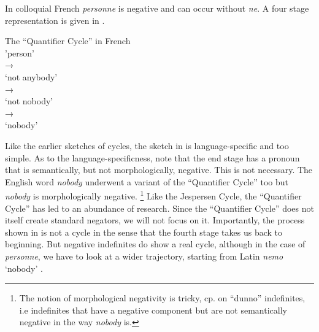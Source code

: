 ﻿\documentclass[output=paper]{langsci/langscibook}
\begin{document}
%
In colloquial
French \textit{personne} is negative and can occur without \textit{ne}. A
four stage representation is given in .
%
\begin{exe}\ex\label{ex:int-qc-french}
          The ``Quantifier Cycle'' in French\\[1ex]
       'person'\\ 
    →\\
      `not anybody'\\
    →\\ 
       `not nobody'\\
    →\\ 
                   `nobody'
\end{exe}
%
Like the earlier sketches of cycles, the sketch in  is
language-specific and too simple. As to the language-specificness, note
that the end stage has a pronoun that is semantically, but not
morphologically, negative. This is not necessary. The English word
\textit{nobody} underwent a variant of the ``Quantifier Cycle'' too but
\textit{nobody} is morphologically negative.%
%
\footnote{The notion of
morphological negativity is tricky, cp. \textcite[130--133]{Haspelmath1997} on
``dunno'' indefinites, i.e indefinites that have a negative component but are
not semantically negative in the way \textit{nobody} is.} %
%
Like the
Jespersen Cycle, the ``Quantifier Cycle'' has led to an abundance of
research. Since the ``Quantifier Cycle'' does not itself create standard
negators, we will not focus on it.  Importantly, the process shown in
  is not a cycle in the sense that the fourth stage takes us
back to beginning. But negative indefinites do show a real cycle, although
in the case of \textit{personne}, we have to look at a wider trajectory,
starting from Latin \textit{nemo} `nobody'
\parencite[cp.][208]{Gianollo2018a}.
%
\end{document}
